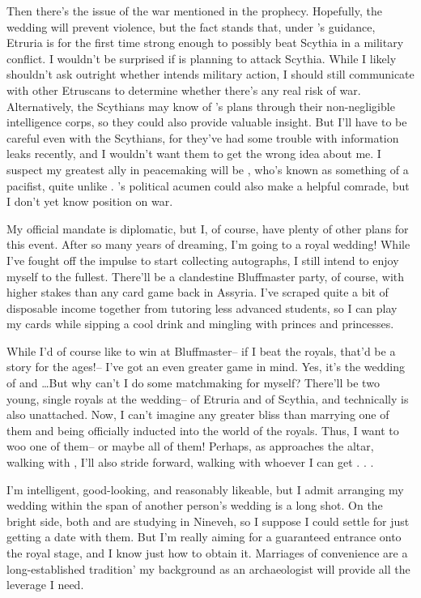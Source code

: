 \documentclass[char]{Kos}
\begin{document}
Then there's the issue of the war mentioned in the prophecy. Hopefully, the wedding will prevent violence, but the fact stands that, under \cEtruriaKing{}'s guidance, Etruria is for the first time strong enough to possibly beat Scythia in a military conflict. I wouldn't be surprised if \cEtruriaKing{} is planning to attack Scythia. While I likely shouldn't ask \cEtruriaKing{\them} outright whether \cEtruriaKing{\they} intends military action, I should still communicate with other Etruscans to determine whether there's any real risk of war. Alternatively, the Scythians may know of \cEtruriaKing{}'s plans through their non-negligible intelligence corps, so they could also provide valuable insight. But I'll have to be careful even with the Scythians, for they've had some trouble with information leaks recently, and I wouldn't want them to get the wrong idea about me. I suspect my greatest ally in peacemaking will be \cGroom{\Prince} \cGroom{}, who's known as something of a pacifist, quite unlike \cGroom{\their} \cEtruriaKing{\parent}. \cBride{}'s political acumen could also make \cBride{\them} a helpful comrade, but I don't yet know \cBride{\their} position on war.

My official mandate is diplomatic, but I, of course, have plenty of other plans for this event. After so many years of dreaming, I'm going to a royal wedding! While I've fought off the impulse to start collecting autographs, I still intend to enjoy myself to the fullest. There'll be a clandestine Bluffmaster party, of course, with higher stakes than any card game back in Assyria. I've scraped quite a bit of disposable income together from tutoring less advanced students, so I can play my cards while sipping a cool drink and mingling with princes and princesses.

While I'd of course like to win at Bluffmaster-- if I beat the royals, that'd be a story for the ages!-- I've got an even greater game in mind. Yes, it's the wedding of \cBride{} and \cGroom{}\ldots But why can't I do some matchmaking for myself? There'll be two young, single royals at the wedding-- \cPoet{} of Etruria and \cWard{} of Scythia, and technically \cEtruriaKing{} is also unattached. Now, I can't imagine any greater bliss than marrying one of them and being officially inducted into the world of the royals. Thus, I want to woo one of them-- or maybe all of them! Perhaps, as \cBride{} approaches the altar, walking with \cGroom{}, I'll also stride forward, walking with whoever I can get . . .

I'm intelligent, good-looking, and reasonably likeable, but I admit arranging my wedding within the span of another person's wedding is a long shot. On the bright side, both \cPoet{} and \cWard{} are studying in Nineveh, so I suppose I could settle for just getting a date with them. But I'm really aiming for a guaranteed entrance onto the royal stage, and I know just how to obtain it. Marriages of convenience are a long-established tradition' my background as an archaeologist will provide all the leverage I need.
\end{document}
